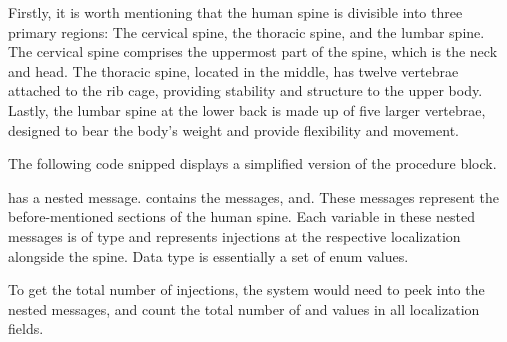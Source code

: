Firstly, it is worth mentioning that the human spine is divisible into three primary regions:
The cervical spine, the thoracic spine, and the lumbar spine.
The cervical spine comprises the uppermost part of the spine, which is the neck and head.
The thoracic spine, located in the middle, has twelve vertebrae attached to the rib cage, providing stability and structure to the upper body.
Lastly, the lumbar spine at the lower back is made up of five larger vertebrae, designed to bear the body's weight and provide flexibility and movement.


The following code snipped displays a simplified version of the procedure block.



 has a nested message.
 contains the messages, and.
These messages represent the before-mentioned sections of the human spine.
Each variable in these nested messages is of type and represents injections at the respective localization alongside the spine.
Data type is essentially a set of enum values.

To get the total number of injections, the system would need to peek into the nested messages, and count the total number of and values in all localization fields.

